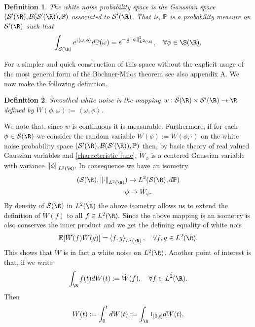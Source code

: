 \documentclass[12pt]{article}
\newtheorem{definition}{Definition}
\newcommand{\br}[1]{\left\langle#1\right\rangle}
\begin{document}
\begin{definition}
	The \emph{white noise probability space} is the Gaussian space $(\Ss'(\R),\Bb(\Ss'(\R)),\mathbb{P} )$ associated to $\Ss'(\R)$. That is, $\mathbb{P} $ is a probability measure on $\Ss'(\R)$ such that
	\begin{equation}\label{characteristic func}
		\int_{\Ss(\R)} e^{i\br{\omega,\phi}}d \mathbb{P}(\omega)=e^{-\frac{1}{2}\norm{\phi}_{L^2(\R)}^2},\quad\forall \phi\in \S(\R).
	\end{equation}
\end{definition}
For a simpler and quick construction of this space without the explicit usage of the most general form of the Bochner-Milos theorem see also \cite{holden1996stochastic} appendix A.
We now make the following definition,
\begin{definition}
	\emph{Smoothed} white noise is the mapping $w:\Ss(\R)\times\Ss'(\R)\to \R$ defined by $\dot{W}(\phi,\omega):=\br{\omega,\phi}$.
\end{definition}
We note that, since $w$ is continuous it is measurable. Furthermore, if for each $\phi\in \Ss(\R)$ we consider the random variable   $\dot{W}(\phi):=\dot{W}(\phi,\cdot )$ on the white noise probability space $(\Ss'(\R),\Bb(\Ss'(\R)),\mathbb{P} )$ then, by basic theory of real valued Gaussian variables and \eqref{characteristic func}, $\dot{W}_\phi$ is a centered Gaussian variable with variance $\norm{\phi}_{L^2(\R)}$. In consequence we have an isometry
\begin{align*}
	(\Ss(\R),\norm{\cdot }  _{L^2(\R)} & )\to L^2(\Ss(\R),d\mathbb{P}) \\
	                                   & \phi\to \dot{W}_\phi.
\end{align*}
By density of $\Ss(\R)$ in $L^2(\R)$ the above isometry allows us to extend the definition of $\dot{W}(f)$ to all $f\in L^2(\R).$ Since the above mapping is an isometry is also conserves the inner product and we get the defining equality of white nois
\begin{equation*}
	\E[\dot{W}(f)\dot{W}(g)]=\br{f,g}_{L^2(\R)},\quad\forall f,g\in L^2(\R).
\end{equation*}
This shows that $\dot{W}$ is in fact a white noise on $L^2(\R)$. Another point of interest is that, if we write
\begin{equation}\label{iso}
	\int_{\R}f(t) dW(t):=\dot{W}(f),\quad\forall f\in L^2(\R).
\end{equation}
Then
\begin{equation*}
	W(t):=\int_{0}^t dW(t):= \int_{\R}1_{[0,t]} dW(t),
\end{equation*}
\end{document}
